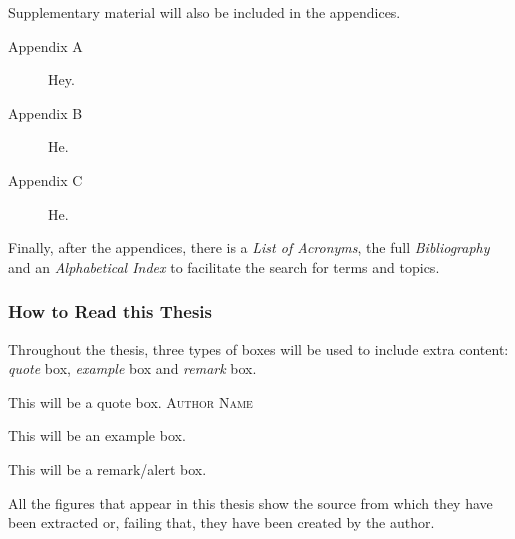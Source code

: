 Supplementary material will also be included in the appendices.

\begin{description}
  \item [Appendix A] Hey. 
  \item [Appendix B] He. 
  \item [Appendix C] He. 
\end{description}

Finally, after the appendices, there is a \textsl{List of Acronyms}, the full
\textsl{Bibliography} and an \textsl{Alphabetical Index} to facilitate the
search for terms and topics.

\subsubsection{How to Read this Thesis}

Throughout the thesis, three types of boxes will be used to include extra
content: \emph{quote} box, \emph{example} box and \emph{remark} box.

\begin{quoteBox}
  This will be a quote box.
  \tcblower\textsc{Author Name}
\end{quoteBox}

\begin{exampleBox}
  This will be an example box.
\end{exampleBox}

\begin{remarkBox}
  This will be a remark/alert box.
\end{remarkBox}

All the figures that appear in this thesis show the source from which they have
been extracted or, failing that, they have been created by the author.
